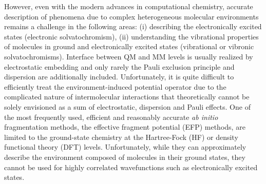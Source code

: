 \documentclass[aip,amsmath,amssymb,reprint,floatfix]{revtex4-1}
\begin{document}
However, even with the modern advances in computational chemistry, 
accurate description of phenomena due to complex heterogeneous molecular environments 
remains a challenge in the following areas: (i) describing the electronically excited states 
(electronic solvatochromism),\cite{Barbati.JACS.2014,
Szabla.Sponer.Jiri.Gora.JPCL.2015,
Bednarska.Zalesny.Tian.Murugan.Agren.Bartkowiak.Molecules.2017,
Jedrzejewska.Grabarz.Bartkowiak.Osmialowski.SpectChimActA.2018} 
(ii) understanding the vibrational properties of molecules in ground and electronically excited states
(vibrational or vibronic solvatochromisms).\cite{Blasiak.Londergan.Webb.Cho.ACR.2017} 
Interface between QM and MM levels is usually realized by electrostatic embedding
and only rarely the Pauli exclusion principle and dispersion are additionally included.\cite{List.Olsen.Kongsted.PCCP.2016}
Unfortunately, it is quite difficult to efficiently treat the environment\hyp{}induced potential operator
due to the complicated nature of intermolecular interactions that theoretically
cannot be solely envisioned as a sum of electrostatic, dispersion and Pauli effects.
One of the most frequently used, efficient and reasonably accurate \emph{ab initio} fragmentation methods,
the effective fragment potential (EFP) methods, are limited to the ground\hyp{}state
chemistry at the Hartree\hyp{}Fock (HF)\cite{Roothaan.RevModPhys.1951,Gordon.Smith.Xu.Slipchenko.AnnuRevPhysChem.2013} 
or density functional theory (DFT) levels\cite{Nguyen.Pachter.Day.JCP.2014}.
Unfortunately, while they can approximately describe the environment composed of molecules in their ground states,
they cannot be used for highly correlated wavefunctions such as electronically excited states.
\end{document}
